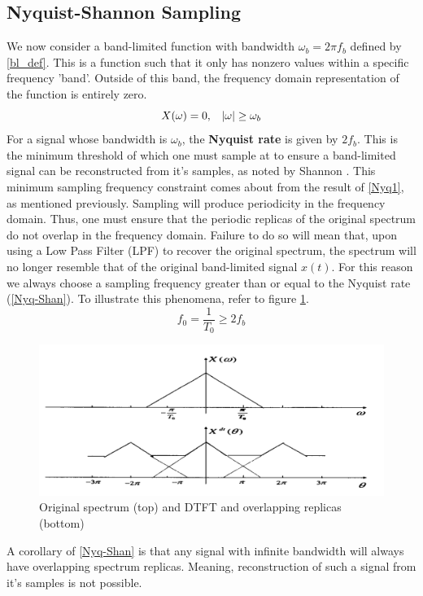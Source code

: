 \subsection{Nyquist-Shannon Sampling}
We now consider a band-limited function with bandwidth $\omega_b = 2 \pi f_b$ defined by \ref{bl_def}. This is a function such that it only has nonzero values within a specific frequency 'band'. Outside of this band, the frequency domain representation of the function is entirely zero.
\begin{equation}\label{bl_def}
    X(\omega) = 0, \hspace{3mm} |\omega| \geq \omega_b
\end{equation}
For a signal whose bandwidth is $\omega_b$, the \textbf{Nyquist rate} is given by $2f_b$. This is the minimum threshold of which one must sample at to ensure a band-limited signal can be reconstructed from it's samples, as noted by Shannon \cite{SP_03_textbook}. This minimum sampling frequency constraint comes about from the result of \ref{Nyq1}, as mentioned previously. Sampling will produce periodicity in the frequency domain. Thus, one must ensure that the periodic replicas of the original spectrum do not overlap in the frequency domain. Failure to do so will mean that, upon using a Low Pass Filter (LPF) to recover the original spectrum, the spectrum will no longer resemble that of the original band-limited signal $x(t)$. For this reason we always choose a sampling frequency greater than or equal to the Nyquist rate (\ref{Nyq-Shan}). To illustrate this phenomena, refer to figure \ref{Aliases_underSamp}. 
\begin{equation}\label{Nyq-Shan}
    f_0 = \dfrac{1}{T_0} \geq 2f_b
\end{equation}
\begin{figure}
        \centering
        \includegraphics[scale = 1.0]{images/Aliases-under sampled.png}
        \caption{Original spectrum (top) and DTFT and overlapping replicas (bottom) \cite{SP_03_textbook}}
        \label{Aliases_underSamp}
\end{figure}
A corollary of \ref{Nyq-Shan} is that any signal with infinite bandwidth will always have overlapping spectrum replicas. Meaning, reconstruction of such a signal from it's samples is not possible.


